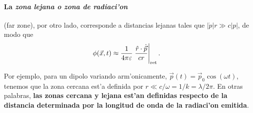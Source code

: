 \paragraph{La \textit{zona lejana o zona de radiaci'on}} (far zone), por otro lado, corresponde a distancias lejanas tales que $|\dot{p}|r\gg c|p|$, de modo que
\begin{equation}
\phi(\vec{x},t)\approx\frac{1}{4\pi\varepsilon}\left.\frac{\hat{r}\cdot\dot{\vec{p}}}{cr}\right|_{\rm ret}.
\end{equation}

Por ejemplo, para un dipolo variando arm'onicamente, $\vec{p}(t)=\vec{p}_0\cos(\omega t)$, tenemos que la zona cercana est'a definida por $r\ll c/\omega=1/k=\lambda/2\pi$. En otras palabras, \textbf{las zonas cercana y lejana est'an definidas respecto de la distancia determinada por la longitud de onda de la radiaci'on emitida}.

